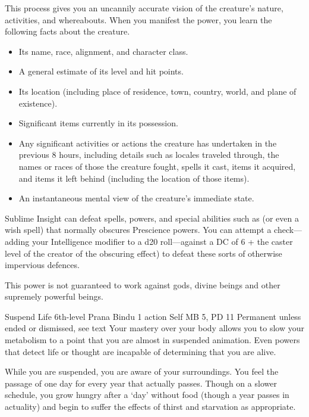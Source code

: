  This process gives you an uncannily accurate vision
  of the creature's nature,
  activities,
  and whereabouts.
  When you manifest the power,
  you learn the following facts about the creature.
  \begin{itemize}
    \item Its name, race, alignment, and character class.
    \item A general estimate of its level and hit points.
    \item Its location (including place of residence, town,
          country, world, and plane of existence).
    \item Significant items currently in its possession.
    \item Any significant activities or actions the creature
          has undertaken in the previous 8 hours,
          including details such as locales traveled through,
          the names or races of those the creature fought,
          spells it cast,
          items it acquired,
          and items it left behind
          (including the location of those items).
    \item An instantaneous mental view of the creature's
          immediate state.
  \end{itemize}

  Sublime Insight can defeat spells,
  powers,
  and special abilities such as 
  (or even a wish spell)
  that normally obscures Prescience powers.
  You can attempt a check---adding your
  Intelligence modifier to a d20 roll---against
  a DC of 6 + the caster level of the
  creator of the obscuring effect)
  to defeat these sorts of otherwise impervious defences.

  This power is not guaranteed to work against gods, divine beings
  and other supremely powerful beings.

\DndPowerHeader%
  {Suspend Life}
  {6th-level Prana Bindu}
  {1 action}
  {Self}
  {MB 5, PD 11}
  {Permanent unless ended or dismissed, see text}
  Your mastery over your body allows you to slow your
  metabolism to a point
  that you are almost in suspended animation.
  Even powers that detect life or thought are
  incapable of determining that you are alive.

  While you are suspended,
  you are aware of your surroundings.
  You feel the passage of one day
  for every year that actually passes.
  Though on a slower schedule,
  you grow hungry after a `day' without food
  (though a year passes in actuality)
  and begin to suffer the effects of
  thirst and starvation as appropriate.
  
